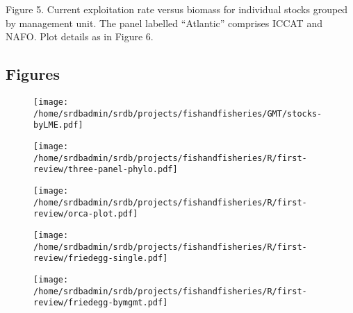\noindent Figure 5. Current exploitation rate versus biomass for
individual stocks grouped by management unit. The panel labelled
``Atlantic'' comprises ICCAT and NAFO. Plot details as in
Figure 6.\\


\newpage
\subsection*{Figures}

\begin{landscape}
\begin{figure}
\begin{center}
\texttt{[image: /home/srdbadmin/srdb/projects/fishandfisheries/GMT/stocks-byLME.pdf]}
\end{center}
\caption{ }\label{fig:lmes}
\end{figure}
\end{landscape}


\begin{figure}
\begin{center}
\texttt{[image: /home/srdbadmin/srdb/projects/fishandfisheries/R/first-review/three-panel-phylo.pdf]} %
\end{center}
\caption{ }\label{fig:taxo:threepanel}
\end{figure}



\begin{landscape}
\begin{figure}
\begin{center}
\texttt{[image: /home/srdbadmin/srdb/projects/fishandfisheries/R/first-review/orca-plot.pdf]}
\end{center}
\caption{ }\label{fig:orca}
\end{figure}
\end{landscape}

\begin{figure}
\begin{center}
\texttt{[image: /home/srdbadmin/srdb/projects/fishandfisheries/R/first-review/friedegg-single.pdf]}
\end{center}
\caption{ }\label{fig:friedegg}
\end{figure}

\begin{figure}
\begin{center}
\texttt{[image: /home/srdbadmin/srdb/projects/fishandfisheries/R/first-review/friedegg-bymgmt.pdf]}
\end{center}
\caption{ }\label{fig:friedeggmgmt}
\end{figure}

